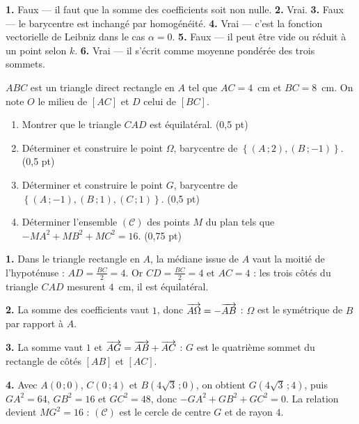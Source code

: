 \begin{corrige}[je me teste]
\textbf{1.} Faux — il faut que la somme des coefficients soit non nulle.
\textbf{2.} Vrai.
\textbf{3.} Faux — le barycentre est inchangé par homogénéité.
\textbf{4.} Vrai — c'est la fonction vectorielle de Leibniz dans le cas
$\alpha = 0$.
\textbf{5.} Faux — il peut être vide ou réduit à un point selon $k$.
\textbf{6.} Vrai — il s'écrit comme moyenne pondérée des trois sommets.
\end{corrige}

\begin{commeaubac}
$ABC$ est un triangle direct rectangle en $A$ tel que $AC = 4$~cm et
$BC = 8$~cm. On note $O$ le milieu de $[AC]$ et $D$ celui de $[BC]$.

\begin{enumerate}[label=\textbf{\arabic*.}, leftmargin=*, itemsep=0.25em]
  \item Montrer que le triangle $CAD$ est équilatéral.
        \hfill\textup{(0,5 pt)}
  \item Déterminer et construire le point $\Omega$, barycentre de
        $\left\{(A\,;2),(B\,;-1)\right\}$. \hfill\textup{(0,5 pt)}
  \item Déterminer et construire le point $G$, barycentre de
        $\left\{(A\,;-1),(B\,;1),(C\,;1)\right\}$. \hfill\textup{(0,5 pt)}
  \item Déterminer l'ensemble $(\mathcal C)$ des points $M$ du plan tels que
        $-MA^{2}+MB^{2}+MC^{2} = 16$. \hfill\textup{(0,75 pt)}
\end{enumerate}
\end{commeaubac}

\begin{corrige}
\textbf{1.} Dans le triangle rectangle en $A$, la médiane issue de $A$ vaut la
moitié de l'hypoténuse : $AD = \frac{BC}{2} = 4$. Or $CD = \frac{BC}{2} = 4$
et $AC = 4$ : les trois côtés du triangle $CAD$ mesurent $4$~cm, il est
équilatéral.

\textbf{2.} La somme des coefficients vaut $1$, donc
$\overrightarrow{A\Omega} = -\overrightarrow{AB}$ : $\Omega$ est le symétrique de $B$ par rapport
à $A$.

\textbf{3.} La somme vaut $1$ et $\overrightarrow{AG} = \overrightarrow{AB}+\overrightarrow{AC}$ : $G$ est
le quatrième sommet du rectangle de côtés $[AB]$ et $[AC]$.

\textbf{4.} Avec $A(0\,;0)$, $C(0\,;4)$ et $B\left(4\sqrt3\,;0\right)$, on
obtient $G\left(4\sqrt3\,;4\right)$, puis $GA^{2} = 64$, $GB^{2} = 16$ et
$GC^{2} = 48$, donc $-GA^{2}+GB^{2}+GC^{2} = 0$. La relation devient
$MG^{2} = 16$ : $(\mathcal C)$ est le cercle de centre $G$ et de rayon $4$.
\end{corrige}

